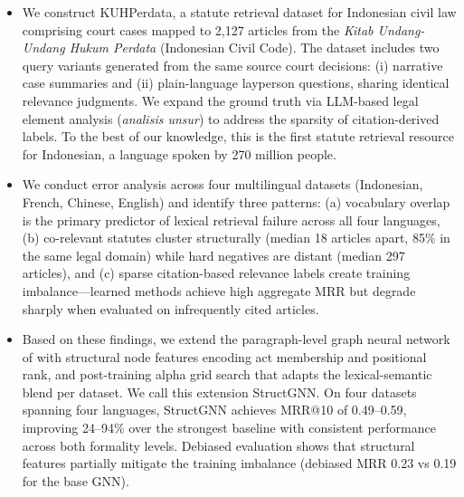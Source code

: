 \begin{itemize}
\item We construct KUHPerdata, a statute retrieval dataset for Indonesian civil law comprising court cases mapped to 2,127 articles from the \textit{Kitab Undang-Undang Hukum Perdata} (Indonesian Civil Code). The dataset includes two query variants generated from the same source court decisions: (i) narrative case summaries and (ii) plain-language layperson questions, sharing identical relevance judgments. We expand the ground truth via LLM-based legal element analysis (\textit{analisis unsur}) to address the sparsity of citation-derived labels. To the best of our knowledge, this is the first statute retrieval resource for Indonesian, a language spoken by 270 million people.

\item We conduct error analysis across four multilingual datasets (Indonesian, French, Chinese, English) and identify three patterns: (a) vocabulary overlap is the primary predictor of lexical retrieval failure across all four languages, (b) co-relevant statutes cluster structurally (median 18 articles apart, 85\% in the same legal domain) while hard negatives are distant (median 297 articles), and (c) sparse citation-based relevance labels create training imbalance---learned methods achieve high aggregate MRR but degrade sharply when evaluated on infrequently cited articles.

\item Based on these findings, we extend the paragraph-level graph neural network of \citet{ilpcsr} with structural node features encoding act membership and positional rank, and post-training alpha grid search that adapts the lexical-semantic blend per dataset. We call this extension StructGNN. On four datasets spanning four languages, StructGNN achieves MRR@10 of 0.49--0.59, improving 24--94\% over the strongest baseline with consistent performance across both formality levels. Debiased evaluation shows that structural features partially mitigate the training imbalance (debiased MRR 0.23 vs 0.19 for the base GNN).
\end{itemize}
